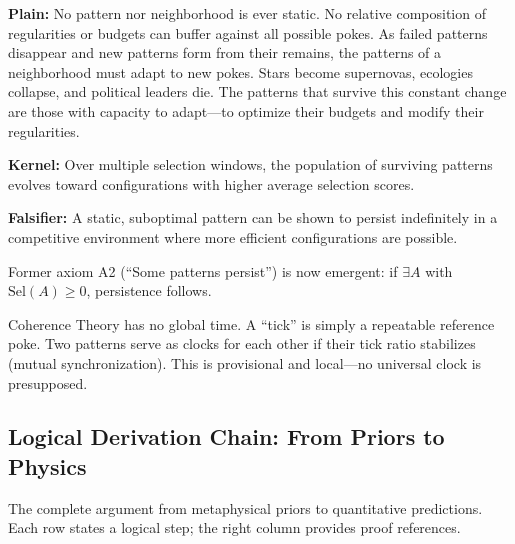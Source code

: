 \begin{description}[leftmargin=2.2cm,style=nextline]
\item[\textbf{P10 (Adaptation is key to survival).}]
\label{prior:P10}\label{prior:adaptation}\label{prior:A11}

\textbf{Plain:} No pattern nor neighborhood is ever static. No relative composition of regularities or budgets can buffer against all possible pokes. As failed patterns disappear and new patterns form from their remains, the patterns of a neighborhood must adapt to new pokes. Stars become supernovas, ecologies collapse, and political leaders die. The patterns that survive this constant change are those with capacity to adapt---to optimize their budgets and modify their regularities.

\textbf{Kernel:} Over multiple selection windows, the population of surviving patterns evolves toward configurations with higher average selection scores.

\textbf{Falsifier:} A static, suboptimal pattern can be shown to persist indefinitely in a competitive environment where more efficient configurations are possible.

\end{description}

\begin{remark}
Former axiom A2 (``Some patterns persist'') is now emergent: if $\exists A$ with $\mathrm{Sel}(A) \geq 0$, persistence follows.
\end{remark}

\begin{remark}
Coherence Theory has no global time. A ``tick'' is simply a repeatable reference poke. Two patterns serve as clocks for each other if their tick ratio stabilizes (mutual synchronization). This is provisional and local---no universal clock is presupposed.
\end{remark}


\subsection*{Logical Derivation Chain: From Priors to Physics}
\label{subsec:derivation-chain-summary}

\noindent
The complete argument from metaphysical priors to quantitative predictions.
Each row states a logical step; the right column provides proof references.

